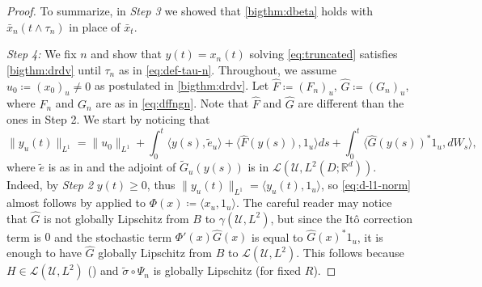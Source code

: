 \documentclass[final]{amsart}
\numberwithin{thm}{section}
\numberwithin{equation}{section}
\newcommand{\U}{\mathcal{U}}
\newcommand{\R}{\mathbb{R}}
\newcommand{\Ll}{\mathcal{L}}
\newcommand{\ip}[2]{\langle #1, #2 \rangle}
\begin{document}
\begin{proof}
    
    
    
    
    
    
    
    
    
    
    
    
    
    
    
    
    
    
    
    
    
    
    
    
    

    To summarize, in \textit{Step 3} we showed that \ref{bigthm:dbeta} holds with $\bar{x}_n(t \wedge \tau_n)$ in place of $\bar{x}_t$.

    \textit{Step 4:}
    We fix $n$ and show that $y(t) = x_n(t)$ solving \eqref{eq:truncated}  satisfies \ref{bigthm:drdv} until $\tau_n$ as in \eqref{eq:def-tau-n}. Throughout, we assume $u_0 \coloneqq (x_0)_u \neq 0$ as postulated in \ref{bigthm:drdv}. Let $\hat F \coloneqq (F_n)_u$, $\hat G \coloneqq (G_n)_u$, 
    where $F_n$ and $G_n$ are as in \eqref{eq:dffngn}. Note that $\hat{F}$ and $\hat{G}$ are different than the ones in Step 2.
    We start by noticing that
    \begin{equation}\label{eq:d-l1-norm}
        \|y_u(t)\|_{L^1} = \|u_0\|_{L^1} + \int_0^t \ip{y(s)}{\tilde e_u} + \ip{\hat F(y(s))}{1_u}ds + \int_0^t \ip{\hat G(y(s))^* 1_u}{dW_s},
    \end{equation}
    where $\tilde e$ is as in  and the adjoint of $\tilde G_u(y(s))$ is in $\Ll(\U,L^2(D;\R^d))$. Indeed, by \textit{Step 2} $y(t) \geq 0$, thus $\|y_u(t)\|_{L^1} = \ip{y_u(t)}{1_u}$, so \eqref{eq:d-l1-norm} almost follows by  applied to $\Phi(x) \coloneqq \ip{x_u}{1_u}$. The careful reader may notice that $\hat G$ is not globally Lipschitz from $B$ to $\gamma(\U, L^2)$, but since the It\^{o} correction term is $0$ and the stochastic term $\Phi'(x)\hat G(x)$ is equal to $\hat G(x)^*1_u$, it is enough to have $\hat G$ globally Lipschitz from $B$ to $\Ll(\U,L^2)$. This follows because $H \in \Ll(\U, L^2)$ () and $\tilde \sigma \circ \Psi_n$ is globally Lipschitz (for fixed $R$).
    
    
    
    
    
    
    
    
    
    
    

\end{proof}
\end{document}
